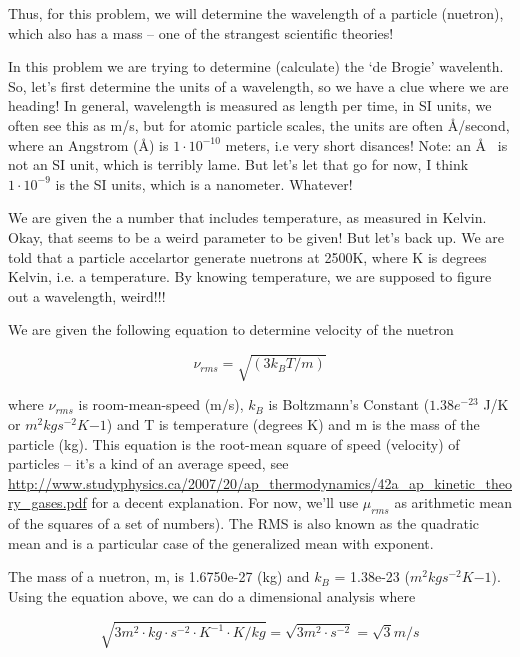 \documentclass{article}
\newcommand{\angstrom}{\textup{\AA}}
\begin{document}
Thus, for this problem, we will determine the wavelength of a particle (nuetron), which also has a mass -- one of the strangest scientific theories!

In this problem we are trying to determine (calculate) the `de Brogie' wavelenth. So, let's first determine the units of a wavelength, so we have a clue where we are heading!  In general, wavelength is measured as length per time, in SI units, we often see this as m/s, but for atomic particle scales, the units are often \angstrom/second, where an Angstrom (\angstrom) is $1 \cdot  10^{-10}$ meters, i.e very short disances! Note: an \angstrom~ is not an SI unit, which is terribly lame. But let's let that go for now, I think $1\cdot 10^{-9}$ is the SI units, which is a nanometer.  Whatever!

We are given the a number that includes temperature, as measured in Kelvin. Okay, that seems to be a weird parameter to be given! But let's back up. We are told that a particle accelartor generate nuetrons at 2500K, where K is degrees Kelvin, i.e. a temperature. By knowing temperature, we are supposed to figure out a wavelength, weird!!!

We are given the following equation to determine velocity of the nuetron

\begin{equation}
\nu_{rms} = \sqrt{(3k_BT/m)}
\end{equation}

where $\nu_{rms}$ is room-mean-speed (m/s), $k_B$ is Boltzmann's Constant ($1.38e^{-23}$ J/K or $m^2kg s^{-2} K{-1}$) and T is temperature (degrees K) and m is the mass of the particle (kg). This equation is the root-mean square of speed (velocity) of particles -- it's a kind of an average speed, see \url{http://www.studyphysics.ca/2007/20/ap_thermodynamics/42a_ap_kinetic_theory_gases.pdf} for a decent explanation. For now, we'll use $\mu_{rms}$ as arithmetic mean of the squares of a set of numbers). The RMS is also known as the quadratic mean and is a particular case of the generalized mean with exponent.

The mass of a nuetron, m, is 1.6750e-27 (kg) and $k_B$ = 1.38e-23 ($m^2kg s^{-2} K{-1}$). Using the equation above, we can do a dimensional analysis where

\begin{equation}
\sqrt{3  m^2\cdot kg\cdot s^{-2} \cdot K^{-1} \cdot K/ kg} = \sqrt{3m^2 \cdot s^{-2}} = \sqrt{3}m/s
\end{equation}
\end{document}

